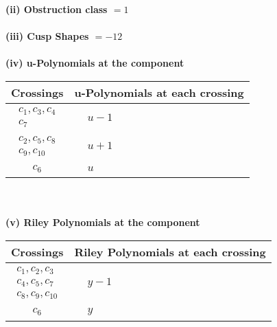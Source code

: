 \documentclass[1p]{elsarticle_modified}
\theoremstyle{definition}
\begin{document}
\flushleft \textbf{(ii) Obstruction class $= 1$}\\~\\
\flushleft \textbf{(iii) Cusp Shapes $= -12$}\\~\\
\newpage\renewcommand{\arraystretch}{1}
\flushleft \textbf{(iv) u-Polynomials at the component}\newline \\
\begin{tabular}{m{50pt}|m{274pt}}
Crossings & \hspace{64pt}u-Polynomials at each crossing \\
\hline $$\begin{aligned}c_{1},c_{3},c_{4}\\c_{7}\end{aligned}$$&$\begin{aligned}
&u-1
\end{aligned}$\\
\hline $$\begin{aligned}c_{2},c_{5},c_{8}\\c_{9},c_{10}\end{aligned}$$&$\begin{aligned}
&u+1
\end{aligned}$\\
\hline $$\begin{aligned}c_{6}\end{aligned}$$&$\begin{aligned}
&u
\end{aligned}$\\
\hline
\end{tabular}\\~\\
\newpage\renewcommand{\arraystretch}{1}
\flushleft \textbf{(v) Riley Polynomials at the component}\newline \\
\begin{tabular}{m{50pt}|m{274pt}}
Crossings & \hspace{64pt}Riley Polynomials at each crossing \\
\hline $$\begin{aligned}c_{1},c_{2},c_{3}\\c_{4},c_{5},c_{7}\\c_{8},c_{9},c_{10}\end{aligned}$$&$\begin{aligned}
&y-1
\end{aligned}$\\
\hline $$\begin{aligned}c_{6}\end{aligned}$$&$\begin{aligned}
&y
\end{aligned}$\\
\hline
\end{tabular}\\~\\
\end{document}
